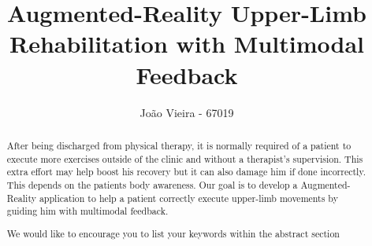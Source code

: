 \documentclass[runningheads,a4paper]{llncs}
\newcommand{\keywords}[1]{\par\addvspace\baselineskip
\noindent\keywordname\enspace\ignorespaces#1}
\begin{document}
\mainmatter  %

\title{Augmented-Reality Upper-Limb Rehabilitation with Multimodal Feedback}

\titlerunning{\doctitle}


\author{Jo\~{a}o Vieira - 67019}
%
\authorrunning{\doctitle}


%
%

\toctitle{\doctitle}
\maketitle

%

\begin{abstract}
After being discharged from physical therapy, it is normally required of a patient to execute more exercises 
outside of the clinic and without a therapist's supervision. 
This extra effort may help boost his recovery but it can also damage him if done incorrectly. 
This depends on the patients body awareness.
Our goal is to develop a Augmented-Reality application to help a patient correctly execute
upper-limb movements by guiding him with multimodal feedback. 
\keywords{We would like to encourage you to list your keywords within
the abstract section}
\end{abstract}
\end{document}
